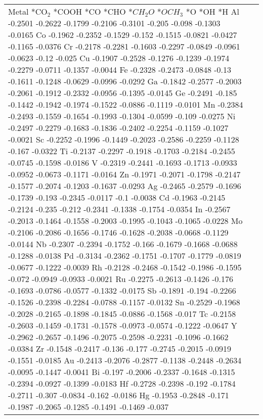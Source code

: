 \begin{table}[h]
    \centering
    \begin{tabular}{lr}
      \hline
      Metal	*CO$_2$	*COOH	*CO	*CHO	*$CH_2O$	*$OCH_3$	*O	*OH	*H
      \hline
      Al	-0.2501	-0.2622	-0.1799	-0.2106	-0.3101	-0.205	-0.098	-0.1303	-0.0165
      Co	-0.1962	-0.2352	-0.1529	-0.152	-0.1515	-0.0821	-0.0427	-0.1165	-0.0376
      Cr	-0.2178	-0.2281	-0.1603	-0.2297	-0.0849	-0.0961	-0.0623	-0.12 	-0.025
      Cu	-0.1907	-0.2528	-0.1276	-0.1239	-0.1974	-0.2279	-0.0711	-0.1357	-0.0044
      Fe	-0.2328	-0.2473	-0.0848	-0.13	  -0.1611	-0.1248	-0.0629	-0.0996	-0.0292
      Ga	-0.1842	-0.2577	-0.2003	-0.2061	-0.1912	-0.2332	-0.0956	-0.1395	-0.0145
      Ge	-0.2491	-0.185	-0.1442	-0.1942	-0.1974	-0.1522	-0.0886	-0.1119	-0.0101
      Mn	-0.2384	-0.2493	-0.1559	-0.1654	-0.1993	-0.1304	-0.0599	-0.109	-0.0275
      Ni	-0.2497	-0.2279	-0.1683	-0.1836	-0.2402	-0.2254	-0.1159	-0.1027	-0.0021
      Sc	-0.2252	-0.1996	-0.1449	-0.2023	-0.2586	-0.2259	-0.1128	-0.167	-0.0322
      Ti	-0.2137	-0.2297	-0.1918	-0.1703	-0.2184	-0.2455	-0.0745	-0.1598	-0.0186
      V 	-0.2319	-0.2441	-0.1693	-0.1713	-0.0933	-0.0952	-0.0673	-0.1171	-0.0164
      Zn	-0.1971	-0.2071	-0.1798	-0.2147	-0.1577	-0.2074	-0.1203	-0.1637	-0.0293
      Ag	-0.2465	-0.2579	-0.1696	-0.1739	-0.193	-0.2345	-0.0117	-0.1  	-0.0038
      Cd	-0.1963	-0.2145	-0.2124	-0.235	-0.212	-0.2341	-0.1338	-0.1754	-0.0354
      In	-0.2567	-0.2013	-0.1464	-0.1558	-0.2003	-0.1995	-0.1043	-0.1065	-0.0228
      Mo	-0.2106	-0.2086	-0.1656	-0.1746	-0.1628	-0.2038	-0.0668	-0.1129	-0.0144
      Nb	-0.2307	-0.2394	-0.1752	-0.166	-0.1679	-0.1668	-0.0688	-0.1288	-0.0138
      Pd	-0.3134	-0.2362	-0.1751	-0.1707	-0.1779	-0.0819	-0.0677	-0.1222	-0.0039
      Rh	-0.2128	-0.2468	-0.1542	-0.1986	-0.1595	-0.072	-0.0949	-0.0933	-0.0021
      Ru	-0.2275	-0.2613	-0.1426	-0.176	-0.1693	-0.0786	-0.0577	-0.1332	-0.0175
      Sb	-0.1891	-0.194	-0.2266	-0.1526	-0.2398	-0.2284	-0.0788	-0.1157	-0.0132
      Sn	-0.2529	-0.1968	-0.2028	-0.2165	-0.1898	-0.1845	-0.0886	-0.1568	-0.017
      Tc	-0.2158	-0.2603	-0.1459	-0.1731	-0.1578	-0.0973	-0.0574	-0.1222	-0.0647
      Y	  -0.2962	-0.2657	-0.1496	-0.2075	-0.2598	-0.2231	-0.1096	-0.1662	-0.0384
      Zr	-0.1548	-0.2417	-0.136	-0.177	-0.2745	-0.2015	-0.0919	-0.1551	-0.0185
      Au	-0.2413	-0.2076	-0.2877	-0.1138	-0.2448	-0.2634	-0.0095	-0.1447	-0.0041
      Bi	-0.197	-0.2006	-0.2337	-0.1648	-0.1315	-0.2394	-0.0927	-0.1399	-0.0183
      Hf	-0.2728	-0.2398	-0.192	-0.1784	-0.2711	-0.307	-0.0834	-0.162	-0.0186
      Hg	-0.1953	-0.2848	-0.171	-0.1987	-0.2065	-0.1285	-0.1491	-0.1469	-0.037

\end{tabular}
\end{table}
